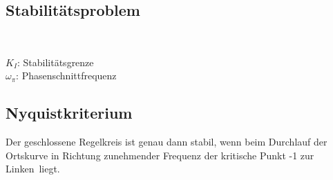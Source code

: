 
	\subsection{Stabilitätsproblem }
		\begin{minipage}{5cm}
		 \\
		\end{minipage}
		\begin{minipage}{13cm}
        $K_I$: Stabilitätsgrenze \\
        $\omega_\pi$: Phasenschnittfrequenz
        \end{minipage}


	\subsection{Nyquistkriterium }
		Der geschlossene Regelkreis ist genau dann stabil, wenn beim Durchlauf der
		Ortskurve in Richtung zunehmender Frequenz der kritische Punkt -1 \glqq zur
		Linken\grqq\ liegt.
		
